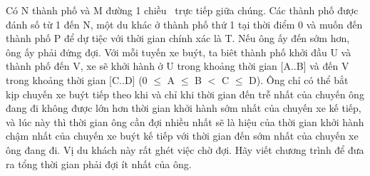Có N thành phố và M đường 1 chiều  trực tiếp giữa chúng. Các thành phố được đánh số từ 1 đến N, một du khác ở thành phố thứ 1 tại thời điểm 0 và muốn đến thành phố P để dự tiệc với thời gian chính xác là T. Nếu ông ấy đến sớm hơn, ông ấy phải đứng đợi. Với mỗi tuyến xe buýt, ta biêt thành phố khởi đầu U và thành phố đến V, xe sẽ khởi hành ở U trong khoảng thời gian [A..B] và đến V trong khoảng thời gian [C..D] (0  $\le$  A  $\le$  B $<$ C  $\le$  D). Ông chỉ có thể bắt kịp chuyến xe buýt tiếp theo khi và chỉ khi thời gian đến trễ nhất của chuyến ông đang đi không được lớn hơn thời gian khởi hành sớm nhất của chuyến xe kế tiếp, và lúc này thì thời gian ông cần đợi nhiều nhất sẽ là hiệu của thời gian khởi hành chậm nhất của chuyến xe buýt kế tiếp với thời gian đến sớm nhất của chuyến xe ông đang đi.
Vị du khách này rất ghét việc chờ đợi. Hãy viết chương trình để đưa ra tổng thời gian phải đợi ít nhất của ông.